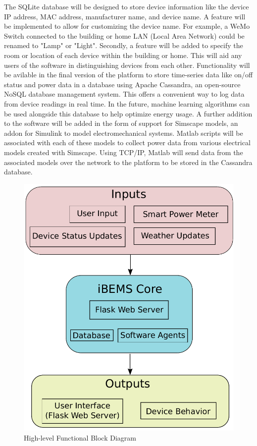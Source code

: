 \documentclass[12pt]{article} %
\begin{document}
The SQLite database will be designed to store device information like the device IP address, MAC address, manufacturer name, and device name. A feature will be implemented to allow for customizing the device name. For example, a WeMo Switch connected to the building or home LAN (Local Area Network) could be renamed to "Lamp" or "Light". Secondly, a feature will be added to specify the room or location of each device within the building or home. This will aid any users of the software in distinguishing devices from each other. 
\medbreak\noindent
Functionality will be avilable in the final version of the platform to store time-series data like on/off status and power data in a database using Apache Cassandra, an open-source NoSQL database management system. This offers a convenient way to log data from device readings in real time. In the future, machine learning algorithms can be used alongside this database to help optimize energy usage.
\medbreak\noindent
A further addition to the software will be added in the form of support for Simscape models, an addon for Simulink to model electromechanical systems. Matlab scripts will be associated with each of these models to collect power data from various electrical models created with Simscape. Using TCP/IP, Matlab will send data from the associated models over the network to the platform to be stored in the Cassandra database.


\begin{figure}[H]
    \centering
    \includegraphics[scale=0.6]{figs/functionalBlockDiagram}
    \caption{High-level Functional Block Diagram}
    \label{fig:functionalBlockDiagram}
\end{figure}
\end{document}
